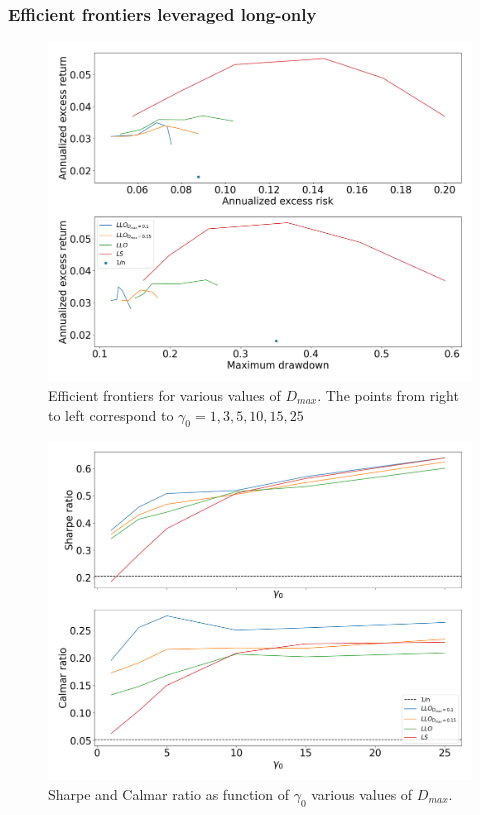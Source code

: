 \subsubsection*{Efficient frontiers leveraged long-only}

\begin{figure}[H]
    \centering
    \includegraphics[width=1\textwidth]{analysis/portfolio_exercise/images/mle/frontier_llo.png}
    \caption[Efficient frontiers for various values of $D_{max}$]{Efficient frontiers for various values of $D_{max}$. The points from right to left correspond to $\gamma_0=1,3,5,10,15,25$}
    \label{fig:MPC_frontier_llo}
\end{figure}

\begin{figure}[H]
    \centering
    \includegraphics[width=1\textwidth]{analysis/portfolio_exercise/images/mle/sharpe_frontier_llo.png}
    \caption[Sharpe and Calmar ratio as function of $\gamma_0$ various values of $D_{max}$]{Sharpe and Calmar ratio as function of $\gamma_0$ various values of $D_{max}$.}
    \label{fig:MPC_sharpe_frontier_llo}
\end{figure}

